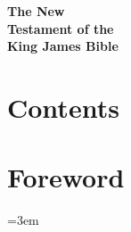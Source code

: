


\cleardoublepage
\thispagestyle{empty}


\cleardoublepage
\thispagestyle{empty}
\vspace*{\fill}
\begin{center}
{\Huge\bfseries The New}\\[1em]
{\Huge\bfseries Testament of the}\\[1em]
{\Huge\bfseries King James Bible}
\end{center}
\vspace*{\fill}
\clearpage

\cleardoublepage
{}
\setcounter{page}{1}
\renewcommand{\contentsname}{} %
\chapter*{\vspace*{-3em}\centering\Huge Contents\vspace{-1em}}
\vspace*{-4em} %
\tableofcontents*
\newpage

\cleardoublepage
{}
\setcounter{page}{1}

\cleardoublepage
\chapter*{Foreword}


\twocolumn
{}
\emergencystretch=3em
\sloppy
